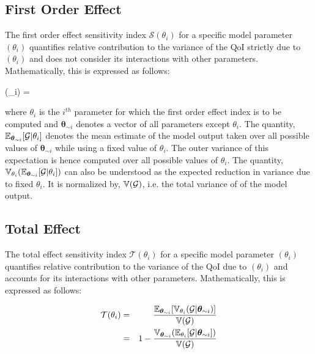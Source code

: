\subsection{First Order Effect}

The first order effect sensitivity index $\mathcal{S}(\theta_{i})$ for a specific model
parameter $(\theta_{i})$ quantifies relative contribution to the variance of the QoI
strictly due to $(\theta_{i})$ and does not consider its interactions with other parameters.
Mathematically, this is expressed as follows:

\be
{}(\theta_{i}) = 
\ee

\noindent where $\theta_{i}$ is the $i^{th}$ parameter for which the first order effect index is to be
computed and $\bm \theta_{\sim i}$ denotes a vector of all parameters except $\theta_{i}$. The quantity,
$\operatorname{\mathbb{E}}_{\bm \theta_{\sim i}}[\mathcal{G}\vert\theta_{i}]$ denotes the mean estimate of the model output
taken over all possible values of $\bm \theta_{\sim i}$ while using a fixed value of $\theta_{i}$. The
outer variance of this expectation is hence computed over all possible values of $\theta_{i}$.
The quantity, $\operatorname{\mathbb{V}}_{\theta_{i}}(\operatorname{\mathbb{E}}_{\bm \theta_{\sim i}}[\mathcal{G}\vert\theta_{i}])$ can also be
understood as the expected reduction in variance due to fixed $\theta_{i}$.
It is normalized by, $\operatorname{\mathbb{V}}(\mathcal{G})$, i.e. the total variance of of the model output.

\subsection{Total Effect}

The total effect sensitivity index $\mathcal{T}(\theta_{i})$ for a specific model
parameter $(\theta_{i})$ quantifies relative contribution to the variance of the QoI
due to $(\theta_{i})$ and accounts for its interactions with other parameters.
Mathematically, this is expressed as follows:

\begin{eqnarray}
\mathcal{T}(\theta_{i}) &=& \frac{\E_{\bm \theta_{\sim i}}[\V_{\theta_{i}}(\mathcal{G}\vert\bm{\theta}_{\sim i})]}{\V(\mathcal{G})} \\ \vspace{1mm}
			&=& 1 - \frac{\V_{\bm \theta_{\sim i}}(\E_{\theta_{i}}[\mathcal{G}\vert\bm\theta_{\sim i}])}{\V(\mathcal{G})}
\end{eqnarray}

